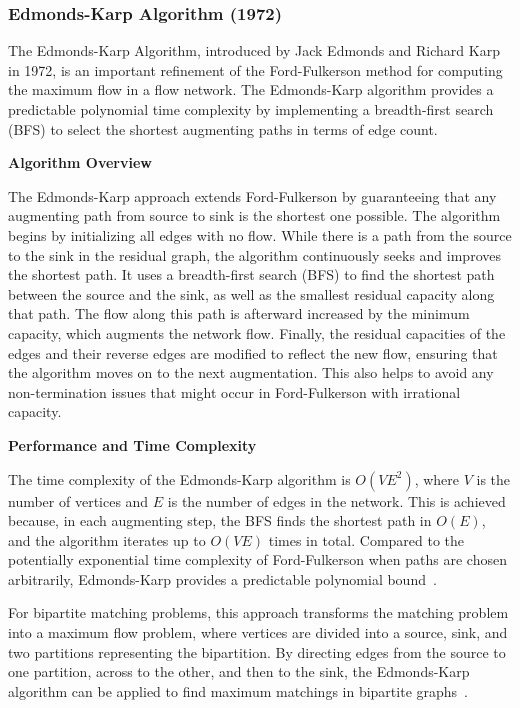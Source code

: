 
\subsubsection*{Edmonds-Karp Algorithm (1972)}

The Edmonds-Karp Algorithm, introduced by Jack Edmonds and Richard Karp in 1972, is an important refinement of the Ford-Fulkerson method for computing the maximum flow in a flow network. The Edmonds-Karp algorithm provides a predictable polynomial time complexity by implementing a breadth-first search (BFS) to select the shortest augmenting paths in terms of edge count.

\textbf{Algorithm Overview}

The Edmonds-Karp approach extends Ford-Fulkerson by guaranteeing that any augmenting path from source to sink is the shortest one possible. The algorithm begins by initializing all edges with no flow. While there is a path from the source to the sink in the residual graph, the algorithm continuously seeks and improves the shortest path. It uses a breadth-first search (BFS) to find the shortest path between the source and the sink, as well as the smallest residual capacity along that path. The flow along this path is afterward increased by the minimum capacity, which augments the network flow. Finally, the residual capacities of the edges and their reverse edges are modified to reflect the new flow, ensuring that the algorithm moves on to the next augmentation. This also helps to avoid any non-termination issues that might occur in Ford-Fulkerson with irrational capacity.

\textbf{Performance and Time Complexity}

The time complexity of the Edmonds-Karp algorithm is \(O(VE^2)\), where \(V\) is the number of vertices and \(E\) is the number of edges in the network. This is achieved because, in each augmenting step, the BFS finds the shortest path in \(O(E)\), and the algorithm iterates up to \(O(VE)\) times in total. Compared to the potentially exponential time complexity of Ford-Fulkerson when paths are chosen arbitrarily, Edmonds-Karp provides a predictable polynomial bound~\cite{edmonds_karp}.

For bipartite matching problems, this approach transforms the matching problem into a maximum flow problem, where vertices are divided into a source, sink, and two partitions representing the bipartition. By directing edges from the source to one partition, across to the other, and then to the sink, the Edmonds-Karp algorithm can be applied to find maximum matchings in bipartite graphs~\cite{ahuja}.

